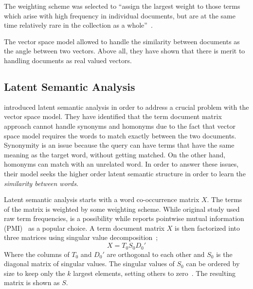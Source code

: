 The weighting scheme was selected to \enquote{assign the largest weight to those terms which arise with high frequency in individual documents, but are at the same time relatively rare in the collection as a whole}~\cite{salton_vector_1975}.

The vector space model allowed \citeauthor{salton_vector_1975} to handle the similarity between documents as the angle between two vectors.
Above all, they have shown that there is merit to handling documents as real valued vectors.

\subsection{Latent Semantic Analysis}%
\label{sub:latent_semantic_analysis}

\textcite{deerwester_indexing_1990} introduced latent semantic analysis in order to address a crucial problem with the vector space model.
They have identified that the term document matrix approach cannot handle synonyms and homonyms due to the fact that vector space model requires the words to match exactly between the two documents.
Synonymity is an issue because the query can have terms that have the same meaning as the target word, without getting matched.
On the other hand, homonyms can match with an unrelated word.
In order to answer these issues, their model seeks the higher order latent semantic structure in order to learn the \emph{similarity between words}.

Latent semantic analysis starts with a word co-occurrence matrix $X$.
The terms of the matrix is weighted by some weighting scheme.
While original study used raw term frequencies, \tfidf{} is a possibility while \textcite{levy_improving_2015} reports pointwise mutual information (PMI)~\cite{church_word_1990} as a popular choice.
A term document matrix $X$ is then factorized into three matrices using singular value decomposition~\cite{forsythe_computer_1977};
\begin{displaymath}
    X = T_{0}S_{0}D_{0}'
\end{displaymath}
Where the columns of $T_{0}$ and $D_{0}'$ are orthogonal to each other and $S_{0}$ is the diagonal matrix of singular values.
The singular values of $S_{0}$ can be ordered by size to keep only the $k$ largest elements, setting others to zero~\cite{deerwester_indexing_1990}.
The resulting matrix is shown as $S$.

